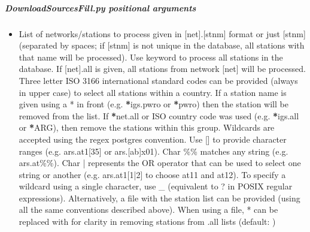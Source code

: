 \documentclass[letterpaper,10pt,english]{sphinxmanual}
\begin{document}
\subparagraph{DownloadSourcesFill.py positional arguments}
\label{\detokenize{pgamit.com:DownloadSourcesFill.py-positional-arguments}}\begin{itemize}
\item {} 
\sphinxAtStartPar
{\hyperref[\detokenize{pgamit.com:DownloadSourcesFill.py-all|net.stnm}]{}} \sphinxhyphen{} List of networks/stations to process given in {[}net{]}.{[}stnm{]} format or just {[}stnm{]} (separated by spaces; if {[}stnm{]} is not unique in the database, all stations with that name will be processed). Use keyword  to process all stations in the database. If {[}net{]}.all is given, all stations from network {[}net{]} will be processed. Three letter ISO 3166 international standard codes can be provided (always in upper case) to select all stations within a country. If a station name is given using a * in front (e.g. {\color{red}\bfseries{}*}igs.pwro or {\color{red}\bfseries{}*}pwro) then the station will be removed from the list. If {\color{red}\bfseries{}*}net.all or ISO country code was used (e.g. {\color{red}\bfseries{}*}igs.all or {\color{red}\bfseries{}*}ARG), then remove the stations within this group. Wildcards are accepted using the regex postgres convention. Use {[}{]} to provide character ranges (e.g. ars.at1{[}3\sphinxhyphen{}5{]} or ars.{[}a\sphinxhyphen{}b{]}x01). Char \%\% matches any string (e.g. ars.at\%\%). Char | represents the OR operator that can be used to select one string or another (e.g. ars.at1{[}1|2{]} to choose at11 and at12). To specify a wildcard using a single character, use \_ (equivalent to ? in POSIX regular expressions). Alternatively, a file with the station list can be provided (using all the same conventions described above). When using a file, * can be replaced with \sphinxhyphen{} for clarity in removing stations from .all lists (default: )

\end{itemize}
\end{document}
